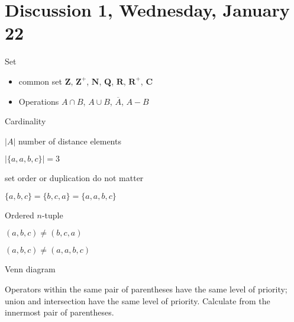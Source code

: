 \section{Discussion 1, Wednesday, January 22}

Set

\begin{itemize}
\item common set $\mathbf{Z}$, $\mathbf{Z}^{+}$, $\mathbf{N}$, $\mathbf{Q}$, $\mathbf{R}$, $\mathbf{R}^{+}$, $\mathbf{C}$
\item Operations $A\cap B$, $A\cup B$, $\overline A$, $A - B$
\end{itemize}

Cardinality 

$|A|$ number of distance elements

\begin{ex}
$|\{a, a, b, c\}| = 3$
\end{ex}

\begin{remark}
set order or duplication do not matter

$\{a, b, c\} = \{b, c, a\} = \{a, a, b, c\}$

\end{remark}

Ordered $n$-tuple

\begin{ex}
$(a, b, c) \neq (b, c, a)$

$(a, b, c) \neq (a, a, b, c)$
\end{ex}

\begin{prob}

Venn diagram

\end{prob}

\begin{remark}

Operators within the same pair of parentheses have the same level of priority; union and intersection have the same level of priority. Calculate from the innermost pair of parentheses.

\end{remark}